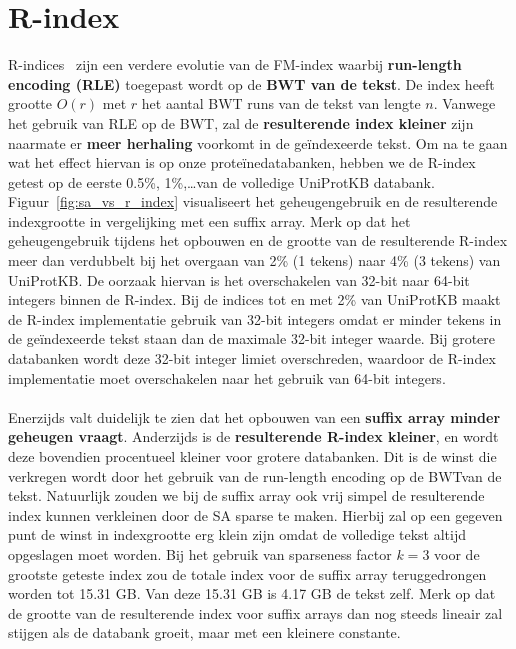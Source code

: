 \section{R-index}\label{sec:r-index}
R-indices~\cite{r_index2, r_index1} zijn een verdere evolutie van de FM-index waarbij \textbf{run-length encoding (RLE)} toegepast wordt op de \textbf{BWT van de tekst}.
De index heeft grootte $O(r)$ met $r$ het aantal BWT runs van de tekst van lengte $n$.
Vanwege het gebruik van RLE op de BWT, zal de \textbf{resulterende index kleiner} zijn naarmate er \textbf{meer herhaling} voorkomt in de geïndexeerde tekst.
Om na te gaan wat het effect hiervan is op onze proteïnedatabanken, hebben we de R-index getest op de eerste 0.5\%, 1\%,\ldots\space van de volledige UniProtKB databank.
Figuur~\ref{fig:sa_vs_r_index} visualiseert het geheugengebruik en de resulterende indexgrootte in vergelijking met een suffix array.
Merk op dat het geheugengebruik tijdens het opbouwen en de grootte van de resulterende R-index meer dan verdubbelt bij het overgaan van 2\% (1 tekens) naar 4\% (3 tekens) van UniProtKB\@.
De oorzaak hiervan is het overschakelen van 32-bit naar 64-bit integers binnen de R-index.
Bij de indices tot en met 2\% van UniProtKB maakt de R-index implementatie gebruik van 32-bit integers omdat er minder tekens in de geïndexeerde tekst staan dan de maximale 32-bit integer waarde.
Bij grotere databanken wordt deze 32-bit integer limiet overschreden, waardoor de R-index implementatie moet overschakelen naar het gebruik van 64-bit integers.
\\ \\
Enerzijds valt duidelijk te zien dat het opbouwen van een \textbf{suffix array minder geheugen vraagt}.
Anderzijds is de \textbf{resulterende R-index kleiner}, en wordt deze bovendien procentueel kleiner voor grotere databanken.
Dit is de winst die verkregen wordt door het gebruik van de run-length encoding op de BWT\@ van de tekst.
Natuurlijk zouden we bij de suffix array ook vrij simpel de resulterende index kunnen verkleinen door de SA sparse te maken.
Hierbij zal op een gegeven punt de winst in indexgrootte erg klein zijn omdat de volledige tekst altijd opgeslagen moet worden.
Bij het gebruik van sparseness factor $k = 3$ voor de grootste geteste index zou de totale index voor de suffix array teruggedrongen worden tot 15.31 GB\@.
Van deze 15.31 GB is 4.17 GB de tekst zelf.
Merk op dat de grootte van de resulterende index voor suffix arrays dan nog steeds lineair zal stijgen als de databank groeit, maar met een kleinere constante.
